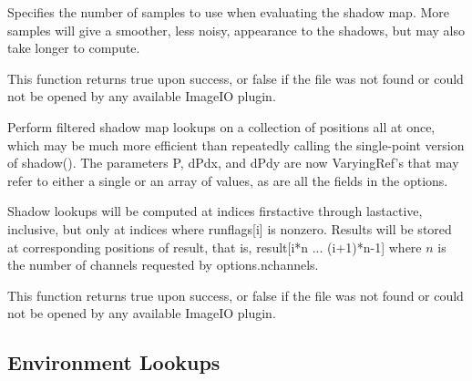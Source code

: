 \vspace{-24pt}
\vspace{10pt}
Specifies the number of samples to use when evaluating the shadow map.
More samples will give a smoother, less noisy, appearance to the
shadows, but may also take longer to compute.
\apiend

This function returns {\cf true} upon success, or {\cf false} if the
file was not found or could not be opened by any available ImageIO
plugin.
\apiend


Perform filtered shadow map lookups on a collection of positions all at
once, which may be much more efficient than repeatedly calling the
single-point version of {\cf shadow()}.  The parameters {\cf P},
{\cf dPdx}, and {\cf dPdy} are now
{\cf VaryingRef}'s that may refer to either a single or an array of
values, as are all the fields in the {\cf options}.

Shadow lookups will be computed at indices {\cf firstactive} through
{\cf lastactive}, inclusive, but only at indices where {\cf runflags[i]}
is nonzero.  Results will be stored at corresponding positions of
{\cf result}, that is, {\cf result[i*n ... (i+1)*n-1]} where $n$ 
is the number of channels requested by {\cf options.nchannels}.

This function returns {\cf true} upon success, or {\cf false} if the
file was not found or could not be opened by any available ImageIO
plugin.
\apiend

\newpage
\subsection{Environment Lookups}
\label{sec:texturesys:api:environment}


